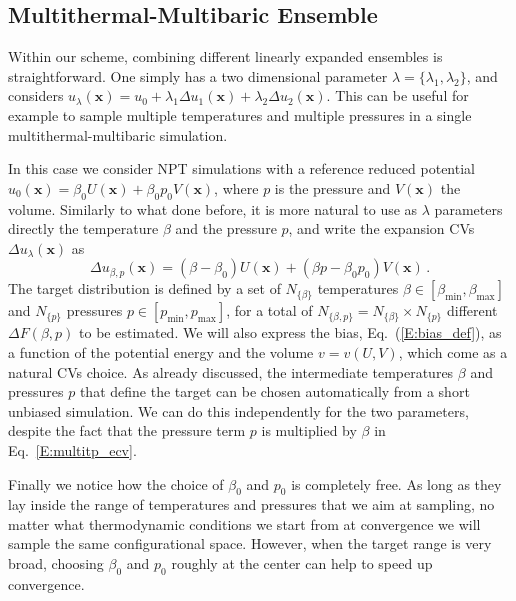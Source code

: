 \documentclass[aps,prx,reprint,superscriptaddress]{revtex4-1} %
\begin{document}
\subsection{Multithermal-Multibaric Ensemble\label{S:multiTP}}
Within our scheme, combining different linearly expanded ensembles is straightforward.
One simply has a two dimensional parameter $\lambda=\{\lambda_1,\lambda_2\}$, and considers $u_\lambda(\mathbf{x})=u_0+\lambda_1\Delta u_1(\mathbf{x})+\lambda_2\Delta u_2(\mathbf{x})$.
This can be useful for example to sample multiple temperatures and multiple pressures in a single multithermal-multibaric simulation.

In this case we consider NPT simulations with a reference reduced potential $u_0(\mathbf{x})=\beta_0 U(\mathbf{x})+\beta_0 p_0 V(\mathbf{x})$, where $p$ is the pressure and $V(\mathbf{x})$ the volume.
Similarly to what done before, it is more natural to use as $\lambda$ parameters directly the temperature $\beta$ and the pressure $p$, and write the expansion CVs $\Delta u_\lambda(\mathbf{x})$ as 
\begin{equation}\label{E:multitp_ecv}
    \Delta u_{\beta,p}(\mathbf{x})=(\beta-\beta_0) U(\mathbf{x})+(\beta p -\beta_0 p_0)V(\mathbf{x})\, .
\end{equation}
The target distribution is defined by a set of $N_{\{\beta\}}$ temperatures $\beta \in [\beta_{\min},\beta_{\max}]$ and $N_{\{p\}}$ pressures $p \in [p_{\min},p_{\max}]$, for a total of $N_{\{\beta,p\}}=N_{\{\beta\}} \times N_{\{p\}}$ different $\Delta F(\beta,p)$ to be estimated.
We will also express the bias, Eq.~(\ref{E:bias_def}), as a function of the potential energy and the volume $v=v(U,V)$, which come as a natural CVs choice.
As already discussed, the intermediate temperatures $\beta$ and pressures $p$ that define the target can be chosen automatically from a short unbiased simulation.
We can do this independently for the two parameters, despite the fact that the pressure term $p$ is multiplied by $\beta$ in Eq.~\ref{E:multitp_ecv}.

Finally we notice how the choice of $\beta_0$ and $p_0$ is completely free.
As long as they lay inside the range of temperatures and pressures that we aim at sampling, no matter what thermodynamic conditions we start from at convergence we will sample the same configurational space.
However, when the target range is very broad, choosing $\beta_0$ and $p_0$ roughly at the center can help to speed up convergence.
\end{document}
